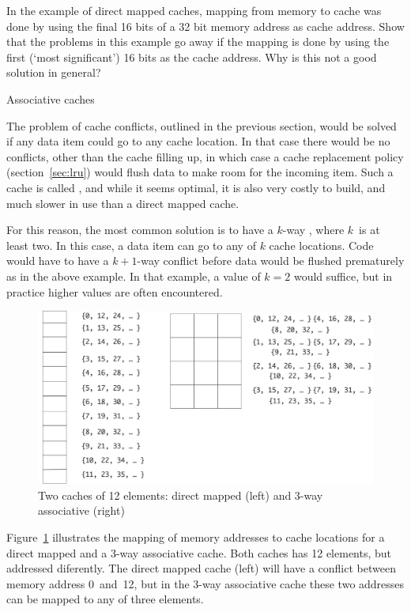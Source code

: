 \begin{exercise}
  In the example of direct mapped caches, mapping from memory to cache
  was done by using the final 16 bits of a 32 bit memory address as
  cache address. Show that the problems in this example go away if the
  mapping is done by using the first (`most significant') 16 bits as
  the cache address. Why is this not a good solution in general?
\end{exercise}

 {Associative caches}
\label{sec:associative}

The problem of cache conflicts, outlined in the previous section, would
be solved if any data item could go to any cache location. In that
case there would be no conflicts, other than the cache filling up, in
which case a cache replacement policy (section~\ref{sec:lru}) would
flush data to make room for the incoming item. Such a cache is called
, and while it seems optimal, it is also
very costly to build, and much slower in use than a direct mapped cache.

For this reason, the most common solution is to have a
$k$-way , where $k$~is at least two. In
this case, a data item can go to any of $k$ cache locations. Code
would have to have a $k+1$-way conflict before data would be flushed
prematurely as in the above example. In that example, a value of $k=2$
would suffice, but in practice higher values are often encountered.
\begin{figure}[ht]
\includegraphics[scale=.12]{graphics-public/assoc-mapping}
\caption{Two caches of 12 elements: direct mapped (left) and 3-way associative (right)}
\label{fig:assoc-mapping}
\end{figure}
Figure~\ref{fig:assoc-mapping} illustrates the mapping of memory
addresses to cache locations for a direct mapped and a 3-way associative
cache. Both caches has 12 elements, but addressed diferently.
The direct mapped cache (left)
will have a conflict between memory address 0~and~12, but
in the 3-way associative cache these two addresses can be mapped
to any of three elements.

